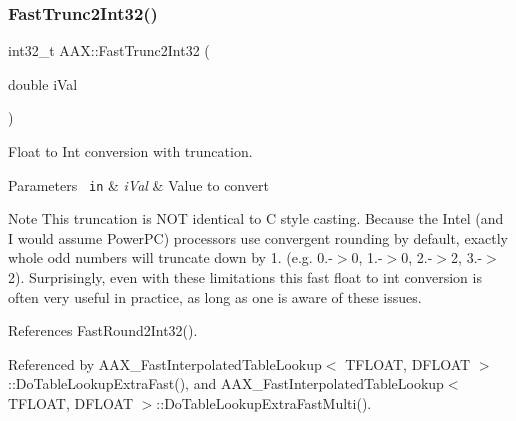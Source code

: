 \subsubsection{\texorpdfstring{FastTrunc2Int32()}{FastTrunc2Int32()}\hspace{0.1cm}{\footnotesize\ttfamily [1/2]}}
{\footnotesize\ttfamily int32\+\_\+t A\+A\+X\+::\+Fast\+Trunc2\+Int32 (\begin{DoxyParamCaption}\item[{double}]{i\+Val }\end{DoxyParamCaption})\hspace{0.3cm}{\ttfamily [inline]}}



Float to Int conversion with truncation. 


\begin{DoxyParams}[1]{Parameters}
\mbox{\texttt{ in}}  & {\em i\+Val} & Value to convert\\
\hline
\end{DoxyParams}
\begin{DoxyNote}{Note}
This truncation is N\+OT identical to C style casting. Because the Intel (and I would assume Power\+PC) processors use convergent rounding by default, exactly whole odd numbers will truncate down by 1. (e.\+g. 0.-\/$>$0, 1.-\/$>$0, 2.-\/$>$2, 3.-\/$>$2). Surprisingly, even with these limitations this fast float to int conversion is often very useful in practice, as long as one is aware of these issues. 
\end{DoxyNote}


References Fast\+Round2\+Int32().



Referenced by A\+A\+X\+\_\+\+Fast\+Interpolated\+Table\+Lookup$<$ T\+F\+L\+O\+A\+T, D\+F\+L\+O\+A\+T $>$\+::\+Do\+Table\+Lookup\+Extra\+Fast(), and A\+A\+X\+\_\+\+Fast\+Interpolated\+Table\+Lookup$<$ T\+F\+L\+O\+A\+T, D\+F\+L\+O\+A\+T $>$\+::\+Do\+Table\+Lookup\+Extra\+Fast\+Multi().

